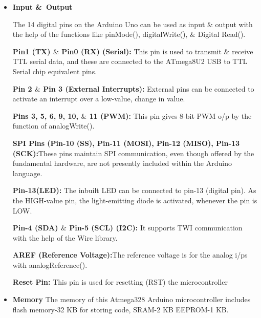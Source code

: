 	\begin{itemize}
        \item  \textbf{Input \&\ Output}
	
	The 14 digital pins on the Arduino Uno can be used as input $\&$ output with the help of the functions like pinMode(), digitalWrite(), $\&$ Digital Read().
	
	\vspace{1\baselineskip}
	\textbf{Pin1 (TX) $\&$ Pin0 (RX) (Serial):} This pin is used to transmit $\&$ receive TTL serial data, and these are connected to the ATmega8U2 USB to TTL Serial chip equivalent pins.

 

	
	\textbf{Pin 2 $\&$ Pin 3 (External Interrupts):}  External pins can be connected to activate an interrupt over a low-value, change in value.

        \vspace{1\baselineskip}
        \textbf{Pins 3, 5, 6, 9, 10, $\&$ 11 (PWM):} This pin gives 8-bit PWM o/p by the function of analogWrite(). 

        \vspace{1\baselineskip}
        \textbf{SPI Pins (Pin-10 (SS), Pin-11 (MOSI), Pin-12 (MISO), Pin-13 (SCK):}These pins maintain SPI communication, even though offered by the fundamental hardware, are not presently included within the Arduino language.

        \vspace{1\baselineskip}
        \textbf{Pin-13(LED): }The inbuilt LED can be connected to pin-13 (digital pin). As the HIGH-value pin, the light-emitting diode is activated, whenever the pin is LOW. 

        \vspace{1\baselineskip}
        \textbf{ Pin-4 (SDA) $\&$ Pin-5 (SCL) (I2C):} It supports TWI communication with the help of the Wire library.


        \vspace{1\baselineskip}
       \textbf{ AREF (Reference Voltage):}The reference voltage is for the analog i/ps with analogReference(). 


         \vspace{1\baselineskip}
         \textbf{ Reset Pin: }This pin is used for resetting (RST) the microcontroller

         \end{itemize}

	
	\begin{itemize}
		\item \textbf{Memory} The memory of this Atmega328 Arduino microcontroller includes flash memory-32 KB for storing code, SRAM-2 KB EEPROM-1 KB.
	
        \end{itemize}

